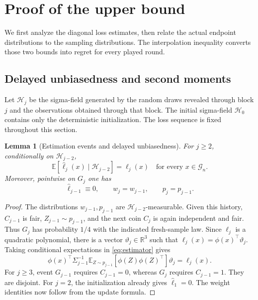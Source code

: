 \documentclass[11pt]{article}
\newtheorem{lemma}[theorem]{Lemma}
\theoremstyle{definition}
\newcommand{\E}{\mathbb E}
\newcommand{\R}{\mathbb R}
\begin{document}
\section{Proof of the upper bound}\label{sec:upper}

We first analyze the diagonal loss estimates, then relate the actual endpoint distributions to the sampling distributions. The interpolation inequality converts those two bounds into regret for every played round.

\subsection{Delayed unbiasedness and second moments}

Let $\mathcal H_j$ be the sigma-field generated by the random draws revealed through block $j$ and the observations obtained through that block. The initial sigma-field $\mathcal H_0$ contains only the deterministic initialization. The loss sequence is fixed throughout this section.

\begin{lemma}[Estimation events and delayed unbiasedness]\label{lem:gate}
For $j\geq2$, conditionally on $\mathcal H_{j-2}$,
\[
 \E[\widehat\ell_j(x)\mid\mathcal H_{j-2}]=\ell_j(x)
 \quad\text{for every }x\in\mathcal G_n.
\]
Moreover, pointwise on $G_j$ one has
\begin{equation}\label{eq:gate-equality}
 \widehat\ell_{j-1}\equiv0,\qquad w_j=w_{j-1},\qquad p_j=p_{j-1}.
\end{equation}
\end{lemma}

\begin{proof}
The distributions $w_{j-1},p_{j-1}$ are $\mathcal H_{j-2}$-measurable. Given this history, $C_{j-1}$ is fair, $Z_{j-1}\sim p_{j-1}$, and the next coin $C_j$ is again independent and fair. Thus $G_j$ has probability $1/4$ with the indicated fresh-sample law. Since $\ell_j$ is a quadratic polynomial, there is a vector $\vartheta_j\in\R^3$ such that $\ell_j(x)=\phi(x)^\top\vartheta_j$. Taking conditional expectations in \eqref{eq:estimator} gives
\[
 \phi(x)^\top\Sigma_{j-1}^{-1}
 \E_{Z\sim p_{j-1}}[\phi(Z)\phi(Z)^\top]\vartheta_j=\ell_j(x).
\]
For $j\geq3$, event $G_{j-1}$ requires $C_{j-1}=0$, whereas $G_j$ requires $C_{j-1}=1$. They are disjoint. For $j=2$, the initialization already gives $\widehat\ell_1=0$. The weight identities now follow from the update formula.
\end{proof}
\end{document}
